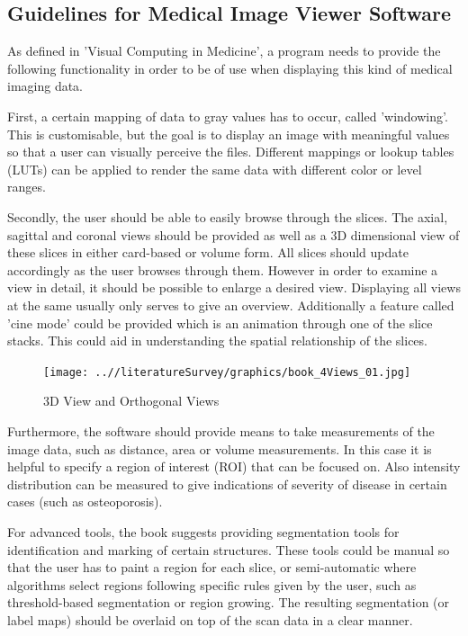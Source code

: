 \documentclass[a4paper,11pt,titlepage]{article}
\begin{document}
\subsection{Guidelines for Medical Image Viewer Software}

As defined in 'Visual Computing in Medicine'\cite{book}, a program needs to provide the following functionality in order to be of use when displaying this kind of medical imaging data. 

First, a certain mapping of data to gray values has to occur, called 'windowing'. This is customisable, but the goal is to display an image with meaningful values so that a user can visually perceive the files. Different mappings or lookup tables (LUTs) can be applied to render the same data with different color or level ranges.

Secondly, the user should be able to easily browse through the slices. The axial, sagittal and coronal views should be provided as well as a 3D dimensional view of these slices in either card-based or volume form. All slices should update accordingly as the user browses through them. However in order to examine a view in detail, it should be possible to enlarge a desired view. Displaying all views at the same usually only serves to give an overview. Additionally a feature called 'cine mode' could be provided which is an animation through one of the slice stacks. This could aid in understanding the spatial relationship of the slices.



\begin{figure}[ht!]
\centering
\texttt{[image: ..//literatureSurvey/graphics/book\_4Views\_01.jpg]}
\caption{3D View and Orthogonal Views}
\label{fig:UIdesign1}
\end{figure}

Furthermore, the software should provide means to take measurements of the image data, such as distance, area or volume measurements. In this case it is helpful to specify a region of interest (ROI) that can be focused on. Also intensity distribution can be measured to give indications of severity of disease in certain cases (such as osteoporosis)\cite{book}.

For advanced tools, the book suggests providing segmentation tools for identification and marking of certain structures. These tools could be manual so that the user has to paint a region for each slice, or semi-automatic where algorithms select regions following specific rules given by the user, such as threshold-based segmentation or region growing. The resulting segmentation (or label maps) should be overlaid on top of the scan data in a clear manner.
\end{document}
